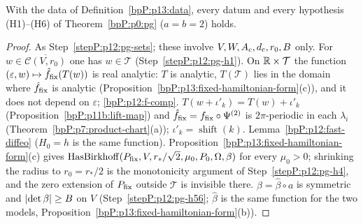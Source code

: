 \begin{proposition}\label{bpP:p13:pg-hypotheses}
With the data of Definition~\ref{bpP:p13:data}, every datum and every hypothesis (H1)--(H6) of Theorem~\ref{bpP:p0:pg} ($a=b=2$) holds.
\end{proposition}
\begin{proof}
\label{stepP:p13:pg-sets} As Step~\ref{stepP:p12:pg-sets}; these involve $V,W,A_c,d_{\rm c},r_0,B$ only.
\label{stepP:p13:pg-h1} For $w\in\overline{\mathcal C(V,r_0)}$ one has $w\in\mathcal T$ (Step~\ref{stepP:p12:pg-h1}). On $\mathbb{R}\times\mathcal T$ the function $(\varepsilon,w)\mapsto\hat f_{\rm fix}(T(w))$ is real analytic: $T$ is analytic, $T(\mathcal T)$ lies in the domain where $\hat f_{\rm fix}$ is analytic (Proposition~\ref{bpP:p13:fixed-hamiltonian-form}(c)), and it does not depend on $\varepsilon$; \ref{bpP:p12:f-comp}.
\label{stepP:p13:pg-h2} $T(w+\iota'_k)=T(w)+\iota'_k$ (Proposition~\ref{bpP:p11b:lift-map}) and $\hat f_{\rm fix}=f_{\rm fix}\circ\Psi^{(2)}$ is $2\pi$-periodic in each $\lambda_i$ (Theorem~\ref{bpP:p7:product-chart}(a)); $\iota'_k=\operatorname{shift}(k)$.
\label{stepP:p13:pg-h3} Lemma~\ref{bpP:p12:fast-diffeo} ($H_0=h$ is the same function).
\label{stepP:p13:pg-h4} Proposition~\ref{bpP:p13:fixed-hamiltonian-form}(c) gives $\operatorname{HasBirkhoff}(P_{\rm fix},V,r_*/\sqrt2,\mu_0,P_0,\Omega,\beta)$ for every $\mu_0>0$; shrinking the radius to $r_0=r_*/2$ is the monotonicity argument of Step~\ref{stepP:p12:pg-h4}, and the zero extension of $P_{\rm fix}$ outside $\mathcal T$ is invisible there.
\label{stepP:p13:pg-h56} $\beta=\hat\beta\circ a$ is symmetric and $\lvert \det\beta\rvert\ge B$ on $V$ (Step~\ref{stepP:p12:pg-h56}; $\hat\beta$ is the same function for the two models, Proposition~\ref{bpP:p13:fixed-hamiltonian-form}(b)).
\end{proof}

